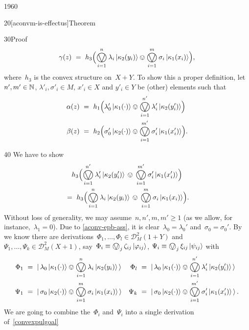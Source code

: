 \begin{parsec}{1960}
\begin{point}{20}[aconvm-is-effectus]{Theorem}
\begin{point}{30}{Proof}
\begin{equation}
    \gamma(z) \ = \  h_3 \Bigl(
    \bigovee^n_{i=1} \lambda_i \ket{\kappa_2(y_i)}
        \ovee \bigovee^m_{i=1} \sigma_i \ket{\kappa_1(x_i)}\Bigr),
\end{equation}
where~$h_3$ is the convex structure on~$X+Y$.
To show this a proper definition,
let~$n',m'\in \mathbb{N}$, $\lambda'_i, \sigma'_i \in M$,
$x'_i \in X$ and $y'_i \in Y$ be (other) elements such that
\begin{align*}
    \alpha(z) &\ =\ 
    h_1\Bigl(\lambda'_0 \ket{\kappa_1(\cdot)}
    \ovee \bigovee^{n'}_{i=1} \lambda'_i \ket{\kappa_2(y'_i)}\Bigr) \\
        \beta(z) &\ =\  h_2 \Bigl(\sigma'_0 \ket{\kappa_2(\cdot)}
    \ovee \bigovee^{m'}_{i=1} \sigma'_i \ket{\kappa_1(x'_i)}\Bigr).
\end{align*}
\begin{point}{40}%
We have to show
\begin{multline}\label{convexpulgoal}
    h_3 \Bigl(
    \bigovee^{n'}_{i=1} \lambda'_i \ket{\kappa_2(y'_i)}
    \,\ovee\, \bigovee^{m'}_{i=1} \sigma'_i \ket{\kappa_1(x'_i)}\Bigr) \\
    \ = \ 
    h_3 \Bigl(
    \bigovee^n_{i=1} \lambda_i \ket{\kappa_2(y_i)}
        \,\ovee\, \bigovee^m_{i=1} \sigma_i \ket{\kappa_1(x_i)}\Bigr).
\end{multline}
Without loss of generality,
    we may assume~$n,n',m,m' \geq 1$
    (as we allow, for instance,~$\lambda_1=0$).
Due to \eqref{aconv-epb-ass},
 it is clear~$\lambda_0 = \lambda_0'$ and~$\sigma_0=\sigma_0'$.
By \sref{elements-coprod-conv}
    we know there
    are derivations~$\Phi_1, \ldots, \Phi_l \in \mathcal{D}_M^2 (1+Y)$
    and~$\Psi_1, \ldots, \Psi_k \in \mathcal{D}_M^2 (X+1)$,
    say~$\Phi_i \equiv \bigovee_j \zeta_{ij} \ket{\varphi_{ij}}$,
    $\Psi_i \equiv \bigovee_j \xi_{ij} \ket{\psi_{ij}}$
    with
\begin{align*}
    \Phi_1 &\ = \ \ket{\,
    \lambda_0 \ket{\kappa_1(\cdot)}
\ovee \bigovee^{n}_{i=1} \lambda_i \ket{\kappa_2(y_i)} \,} &
    \Phi_l &\ = \ \ket{\,
    \lambda_0 \ket{\kappa_1(\cdot)}
\ovee \bigovee^{n'}_{i=1} \lambda'_i \ket{\kappa_2(y'_i)} \,} \\
    \Psi_1 &\ = \ \ket{\,
    \sigma_0 \ket{\kappa_2(\cdot)}
\ovee \bigovee^{m}_{i=1} \sigma_i \ket{\kappa_1(x_i)} \,} &
    \Psi_k &\ = \ \ket{\,
    \sigma_0 \ket{\kappa_2(\cdot)}
\ovee \bigovee^{m'}_{i=1} \sigma'_i \ket{\kappa_1(x'_i)} \,}.
\end{align*}
We are going to combine the~$\Phi_i$ and~$\Psi_i$
into a single derivation of~\eqref{convexpulgoal}

\end{point}
\end{point}
\end{point}
\end{parsec}
